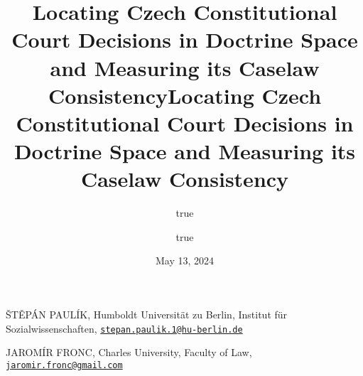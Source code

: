 \documentclass[
  11pt,
]{article}
\title{Locating Czech Constitutional Court Decisions in Doctrine Space
and Measuring its Caselaw Consistency}
\author{true \and true}
\date{May 13, 2024}
\title{Locating Czech Constitutional Court Decisions in Doctrine Space
and Measuring its Caselaw Consistency }
\date{}
\begin{document}



{%
\setlength{\parindent}{0pt}
\thispagestyle{plain}
{%
\maketitle  %

}




{
   \vskip 13.5pt\relax \normalsize\fontsize{11}{12}
   \MakeUppercase{Štěpán Paulík}, \small{Humboldt Universität zu Berlin,
Institut für Sozialwissenschaften,
\href{mailto:stepan.paulik.1@hu-berlin.de}{\nolinkurl{stepan.paulik.1@hu-berlin.de}}}   \par \vskip -3.5pt \MakeUppercase{Jaromír
Fronc}, \small{Charles University, Faculty of Law,
\href{mailto:jaromir.fronc@gmail.com}{\nolinkurl{jaromir.fronc@gmail.com}}}   

}

}
\end{document}
